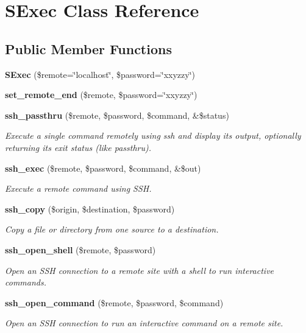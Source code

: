 \section{SExec Class Reference}
\label{classSExec}
\subsection*{Public Member Functions}
\begin{CompactItemize}
\item 
{\bf SExec} (\$remote=\char`\"{}localhost\char`\"{}, \$password=\char`\"{}xxyzzy\char`\"{})
\item 
{\bf set\_\-remote\_\-end} (\$remote, \$password=\char`\"{}xxyzzy\char`\"{})
\item 
{\bf ssh\_\-passthru} (\$remote, \$password, \$command, \&\$status)
\begin{CompactList}\small\item\em Execute a single command remotely using ssh and display its output, optionally returning its exit status (like passthru). \item\end{CompactList}\item 
{\bf ssh\_\-exec} (\$remote, \$password, \$command, \&\$out)
\begin{CompactList}\small\item\em Execute a remote command using SSH. \item\end{CompactList}\item 
{\bf ssh\_\-copy} (\$origin, \$destination, \$password)
\begin{CompactList}\small\item\em Copy a file or directory from one source to a destination. \item\end{CompactList}\item 
{\bf ssh\_\-open\_\-shell} (\$remote, \$password)
\begin{CompactList}\small\item\em Open an SSH connection to a remote site with a shell to run interactive commands. \item\end{CompactList}\item 
{\bf ssh\_\-open\_\-command} (\$remote, \$password, \$command)
\begin{CompactList}\small\item\em Open an SSH connection to run an interactive command on a remote site. \item\end{CompactList}\item 

\end{CompactItemize}
